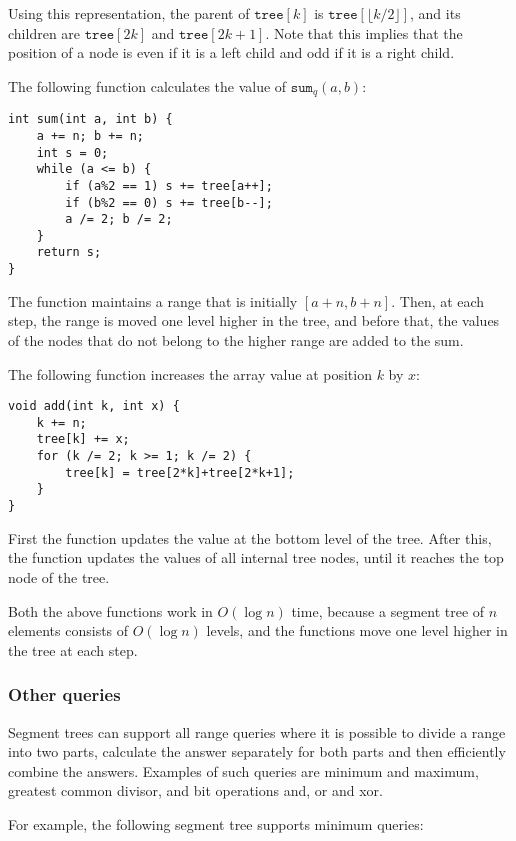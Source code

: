 Using this representation,
the parent of $\texttt{tree}[k]$
is $\texttt{tree}[\lfloor k/2 \rfloor]$,
and its children are $\texttt{tree}[2k]$
and $\texttt{tree}[2k+1]$.
Note that this implies that the position of a node
is even if it is a left child and odd if it is a right child.

The following function
calculates the value of $\texttt{sum}_q(a,b)$:
\begin{lstlisting}
int sum(int a, int b) {
    a += n; b += n;
    int s = 0;
    while (a <= b) {
        if (a%2 == 1) s += tree[a++];
        if (b%2 == 0) s += tree[b--];
        a /= 2; b /= 2;
    }
    return s;
}
\end{lstlisting}
The function maintains a range
that is initially $[a+n,b+n]$.
Then, at each step, the range is moved
one level higher in the tree,
and before that, the values of the nodes that do not
belong to the higher range are added to the sum.

The following function increases the array value
at position $k$ by $x$:
\begin{lstlisting}
void add(int k, int x) {
    k += n;
    tree[k] += x;
    for (k /= 2; k >= 1; k /= 2) {
        tree[k] = tree[2*k]+tree[2*k+1];
    }
}
\end{lstlisting}
First the function updates the value
at the bottom level of the tree.
After this, the function updates the values of all
internal tree nodes, until it reaches
the top node of the tree.

Both the above functions work
in $O(\log n)$ time, because a segment tree
of $n$ elements consists of $O(\log n)$ levels,
and the functions move one level higher
in the tree at each step.

\subsubsection{Other queries}

Segment trees can support all range queries
where it is possible to divide a range into two parts,
calculate the answer separately for both parts
and then efficiently combine the answers.
Examples of such queries are
minimum and maximum, greatest common divisor,
and bit operations and, or and xor.

For example, the following segment tree
supports minimum queries:

